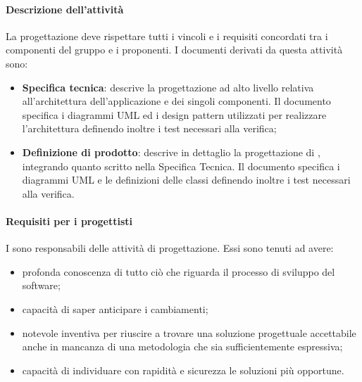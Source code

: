  \paragraph{Descrizione dell'attività}
 La progettazione deve rispettare tutti i vincoli e i requisiti concordati tra i componenti del gruppo
 e i proponenti. I documenti derivati da questa attività sono:
 \begin{itemize}
 	\item \textbf{Specifica tecnica}: descrive la progettazione ad alto livello relativa all'architettura dell'applicazione
 	e dei singoli componenti. Il documento specifica i diagrammi UML ed i design
 	pattern utilizzati per realizzare l'architettura definendo inoltre i test necessari alla verifica;
 	\item \textbf{Definizione di prodotto}: descrive in dettaglio la progettazione di , integrando
 	quanto scritto nella Specifica Tecnica. Il documento specifica i diagrammi UML e le
 	definizioni delle classi definendo inoltre i test necessari alla verifica.
 \end{itemize}

 \paragraph{Requisiti per i progettisti}\label{req prog}
 I \PJP{} sono responsabili delle attività di progettazione. Essi sono tenuti ad avere:
 \begin{itemize}
 	\item profonda conoscenza di tutto ciò che riguarda il processo di sviluppo del software;
 	\item capacità di saper anticipare i cambiamenti;
 	\item notevole inventiva per riuscire a trovare una soluzione progettuale accettabile anche in
mancanza di una metodologia che sia sufficientemente espressiva;
 	\item capacità di individuare con rapidità e sicurezza le soluzioni più opportune.
 \end{itemize}

